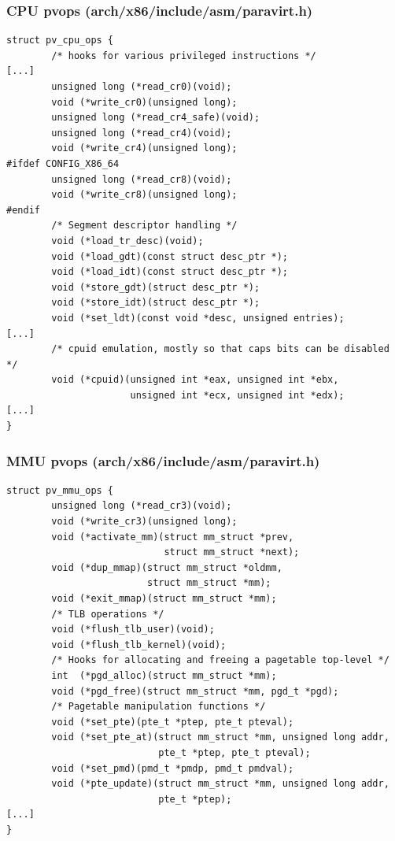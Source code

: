 \begin{frame}[fragile]
\frametitle{CPU pvops (arch/x86/include/asm/paravirt.h)}
\begin{verbatim}
struct pv_cpu_ops {
        /* hooks for various privileged instructions */
[...]
        unsigned long (*read_cr0)(void);
        void (*write_cr0)(unsigned long);
        unsigned long (*read_cr4_safe)(void);
        unsigned long (*read_cr4)(void);
        void (*write_cr4)(unsigned long);
#ifdef CONFIG_X86_64
        unsigned long (*read_cr8)(void);
        void (*write_cr8)(unsigned long);
#endif
        /* Segment descriptor handling */
        void (*load_tr_desc)(void);
        void (*load_gdt)(const struct desc_ptr *);
        void (*load_idt)(const struct desc_ptr *);
        void (*store_gdt)(struct desc_ptr *);
        void (*store_idt)(struct desc_ptr *);
        void (*set_ldt)(const void *desc, unsigned entries);
[...]
        /* cpuid emulation, mostly so that caps bits can be disabled */
        void (*cpuid)(unsigned int *eax, unsigned int *ebx,
                      unsigned int *ecx, unsigned int *edx);
[...]
}
\end{verbatim}
\end{frame}
\begin{frame}[fragile]
\frametitle{MMU pvops (arch/x86/include/asm/paravirt.h)}
\begin{verbatim}
struct pv_mmu_ops {
        unsigned long (*read_cr3)(void);
        void (*write_cr3)(unsigned long);
        void (*activate_mm)(struct mm_struct *prev,
                            struct mm_struct *next);
        void (*dup_mmap)(struct mm_struct *oldmm,
                         struct mm_struct *mm);
        void (*exit_mmap)(struct mm_struct *mm);
        /* TLB operations */
        void (*flush_tlb_user)(void);
        void (*flush_tlb_kernel)(void);
        /* Hooks for allocating and freeing a pagetable top-level */
        int  (*pgd_alloc)(struct mm_struct *mm);
        void (*pgd_free)(struct mm_struct *mm, pgd_t *pgd);
        /* Pagetable manipulation functions */
        void (*set_pte)(pte_t *ptep, pte_t pteval);
        void (*set_pte_at)(struct mm_struct *mm, unsigned long addr,
                           pte_t *ptep, pte_t pteval);
        void (*set_pmd)(pmd_t *pmdp, pmd_t pmdval);
        void (*pte_update)(struct mm_struct *mm, unsigned long addr,
                           pte_t *ptep);
[...]
}
\end{verbatim}
\end{frame}

